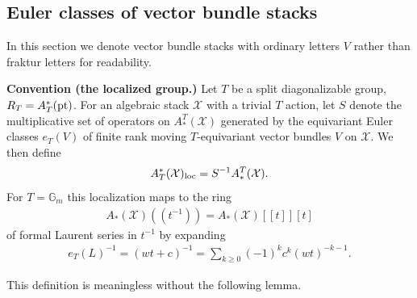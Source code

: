 \subsection{Euler classes of vector bundle stacks}\label{rl-000S}\label{sec:euler-classes-of-vector-bundle-stacks}

In this section we denote vector bundle stacks with ordinary letters \(V\) rather than fraktur letters for readability.

\bigskip

\noindent\textbf{Convention (the localized group.)} Let \(T\) be a split diagonalizable group, \(R_T = A^*_T(\operatorname{pt})\). For an algebraic stack \(\mathcal X\) with a trivial \(T\) action, let \(S\) denote the multiplicative set of operators on \(A^T_*(\mathcal X)\) generated by the equivariant Euler classes \(e_T(V)\) of finite rank moving \(T\)-equivariant vector bundles \(V\) on \(\mathcal X\). We then define
\begin{align*}
  A_T^*(\mathcal X)_{\operatorname{loc}} = S^{-1}A^T_*(\mathcal X).
\end{align*}
For \(T = \mathbb G_m\) this localization maps to the ring
\begin{align*}
  A_*(\mathcal X)(\!(t^{-1})\!) = A_*(\mathcal X)[\![t]\!][t]
\end{align*}
of formal Laurent series in \(t^{-1}\) by expanding
\begin{align*}
  e_T(L)^{-1} = (wt + c)^{-1} = \sum_{k\geq 0}(-1)^kc^k(wt)^{-k-1}.
\end{align*}




This definition is meaningless without the following lemma.


